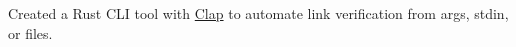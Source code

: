 {Created a Rust CLI tool with \href{https://docs.rs/clap/latest/clap/}{Clap} to automate link verification from args, stdin, or files.}
